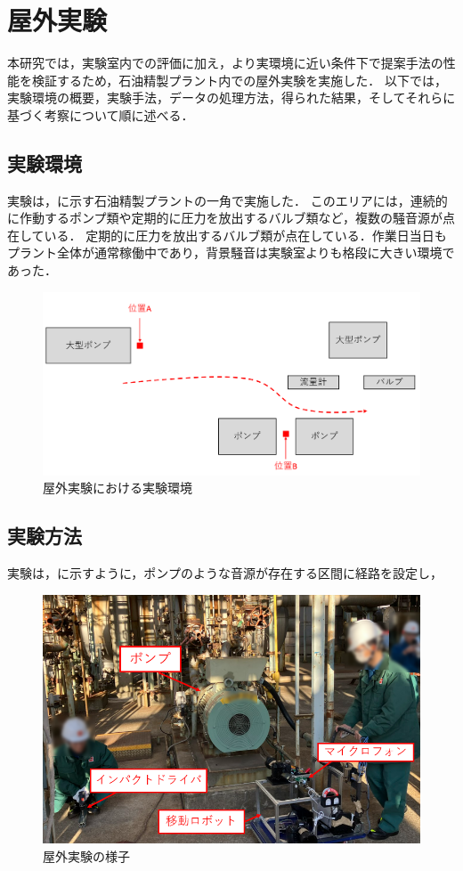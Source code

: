 \documentclass[../main]{subfiles}
\begin{document}
\section{屋外実験}
\label{sec:outdoor_experiment}
本研究では，実験室内での評価に加え，より実環境に近い条件下で提案手法の性能を検証するため，石油精製プラント内での屋外実験を実施した．
以下では，実験環境の概要，実験手法，データの処理方法，得られた結果，そしてそれらに基づく考察について順に述べる．
\subsection{実験環境}
\label{subsec:vexp_ci_environment}
実験は，に示す石油精製プラントの一角で実施した．
このエリアには，連続的に作動するポンプ類や定期的に圧力を放出するバルブ類など，複数の騒音源が点在している．
定期的に圧力を放出するバルブ類が点在している．作業日当日もプラント全体が通常稼働中であり，背景騒音は実験室よりも格段に大きい環境であった．

\begin{figure}[t]
  \centering
  \includegraphics[keepaspectratio, width=1.0\linewidth]{chap4/field_environment.png}
  \caption{屋外実験における実験環境}
  \label{fig:field_environment}
\end{figure}

\subsection{実験方法}
\label{subsec:vexp_ci_method}
実験は，に示すように，ポンプのような音源が存在する区間に経路を設定し，
\begin{figure}[t]
  \centering
  \includegraphics[keepaspectratio, width=0.7\linewidth]{chap4/field_experimental_setup.png}
  \caption{屋外実験の様子}
  \label{fig:field_experimental_setup}
\end{figure}
\end{document}
